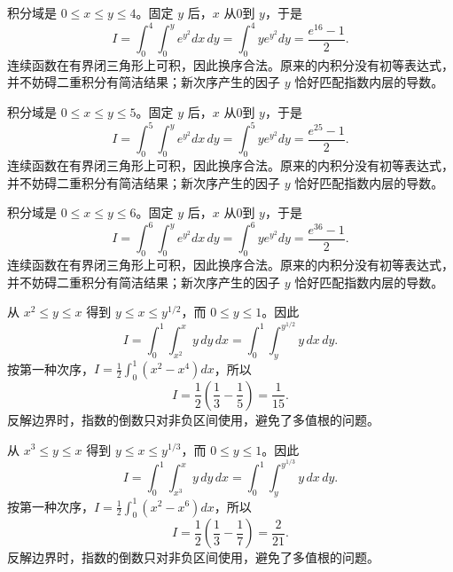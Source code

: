 \documentclass[12pt,fontset=fandol]{ctexart}
\begin{document}
\begin{solve}\label{ans:c37q4}
积分域是 $0\le x\le y\le 4$。固定 $y$ 后，$x$ 从0到 $y$，于是
\[
I=\int_0^{4}\int_0^y e^{y^2}dx\,dy=\int_0^{4}y e^{y^2}dy=\frac{e^{16}-1}2.
\]
连续函数在有界闭三角形上可积，因此换序合法。原来的内积分没有初等表达式，并不妨碍二重积分有简洁结果；新次序产生的因子 $y$ 恰好匹配指数内层的导数。
\end{solve}

\begin{solve}\label{ans:c37q5}
积分域是 $0\le x\le y\le 5$。固定 $y$ 后，$x$ 从0到 $y$，于是
\[
I=\int_0^{5}\int_0^y e^{y^2}dx\,dy=\int_0^{5}y e^{y^2}dy=\frac{e^{25}-1}2.
\]
连续函数在有界闭三角形上可积，因此换序合法。原来的内积分没有初等表达式，并不妨碍二重积分有简洁结果；新次序产生的因子 $y$ 恰好匹配指数内层的导数。
\end{solve}

\begin{solve}\label{ans:c37q6}
积分域是 $0\le x\le y\le 6$。固定 $y$ 后，$x$ 从0到 $y$，于是
\[
I=\int_0^{6}\int_0^y e^{y^2}dx\,dy=\int_0^{6}y e^{y^2}dy=\frac{e^{36}-1}2.
\]
连续函数在有界闭三角形上可积，因此换序合法。原来的内积分没有初等表达式，并不妨碍二重积分有简洁结果；新次序产生的因子 $y$ 恰好匹配指数内层的导数。
\end{solve}

\begin{solve}\label{ans:c37q7}
从 $x^{2}\le y\le x$ 得到 $y\le x\le y^{1/2}$，而 $0\le y\le1$。因此
\[
I=\int_0^1\int_{x^{2}}^x y\,dy\,dx=\int_0^1\int_y^{y^{1/2}}y\,dx\,dy.
\]
按第一种次序，$I=\frac12\int_0^1(x^2-x^{4})dx$，所以
\[
I=\frac12\left(\frac13-\frac1{5}\right)=\frac{1}{15}.
\]
反解边界时，指数的倒数只对非负区间使用，避免了多值根的问题。
\end{solve}

\begin{solve}\label{ans:c37q8}
从 $x^{3}\le y\le x$ 得到 $y\le x\le y^{1/3}$，而 $0\le y\le1$。因此
\[
I=\int_0^1\int_{x^{3}}^x y\,dy\,dx=\int_0^1\int_y^{y^{1/3}}y\,dx\,dy.
\]
按第一种次序，$I=\frac12\int_0^1(x^2-x^{6})dx$，所以
\[
I=\frac12\left(\frac13-\frac1{7}\right)=\frac{2}{21}.
\]
反解边界时，指数的倒数只对非负区间使用，避免了多值根的问题。
\end{solve}
\end{document}
